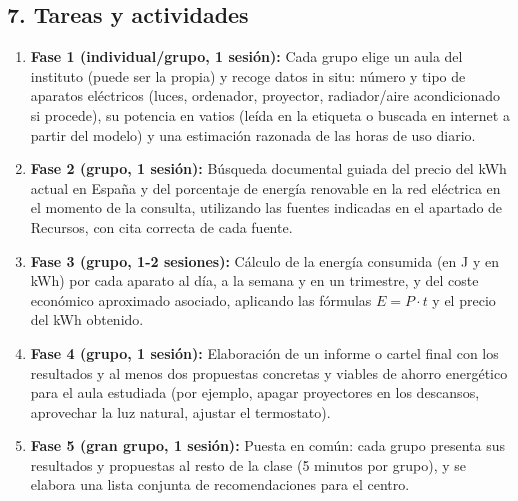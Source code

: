 \documentclass[11pt,a4paper]{article}
\begin{document}
\subsection*{7. Tareas y actividades}
\begin{enumerate}
    \item \textbf{Fase 1 (individual/grupo, 1 sesión):} Cada grupo elige un aula del instituto (puede ser la propia) y recoge datos in situ: número y tipo de aparatos eléctricos (luces, ordenador, proyector, radiador/aire acondicionado si procede), su potencia en vatios (leída en la etiqueta o buscada en internet a partir del modelo) y una estimación razonada de las horas de uso diario.
    \item \textbf{Fase 2 (grupo, 1 sesión):} Búsqueda documental guiada del precio del kWh actual en España y del porcentaje de energía renovable en la red eléctrica en el momento de la consulta, utilizando las fuentes indicadas en el apartado de Recursos, con cita correcta de cada fuente.
    \item \textbf{Fase 3 (grupo, 1-2 sesiones):} Cálculo de la energía consumida (en J y en kWh) por cada aparato al día, a la semana y en un trimestre, y del coste económico aproximado asociado, aplicando las fórmulas $E = P \cdot t$ y el precio del kWh obtenido.
    \item \textbf{Fase 4 (grupo, 1 sesión):} Elaboración de un informe o cartel final con los resultados y al menos dos propuestas concretas y viables de ahorro energético para el aula estudiada (por ejemplo, apagar proyectores en los descansos, aprovechar la luz natural, ajustar el termostato).
    \item \textbf{Fase 5 (gran grupo, 1 sesión):} Puesta en común: cada grupo presenta sus resultados y propuestas al resto de la clase (5 minutos por grupo), y se elabora una lista conjunta de recomendaciones para el centro.
\end{enumerate}
\end{document}
